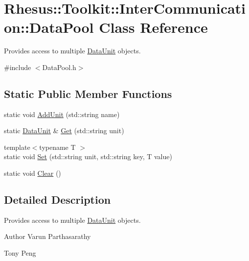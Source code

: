 \hypertarget{class_rhesus_1_1_toolkit_1_1_inter_communication_1_1_data_pool}{\section{Rhesus\-:\-:Toolkit\-:\-:Inter\-Communication\-:\-:Data\-Pool Class Reference}
\label{class_rhesus_1_1_toolkit_1_1_inter_communication_1_1_data_pool}
}


Provides access to multiple \hyperlink{class_rhesus_1_1_toolkit_1_1_inter_communication_1_1_data_unit}{Data\-Unit} objects.  




{\ttfamily \#include $<$Data\-Pool.\-h$>$}

\subsection*{Static Public Member Functions}
\begin{DoxyCompactItemize}
\item 
static void \hyperlink{class_rhesus_1_1_toolkit_1_1_inter_communication_1_1_data_pool_ad99c0b4b6f7d21ea959011e22dc0703d}{Add\-Unit} (std\-::string name)
\item 
static \hyperlink{class_rhesus_1_1_toolkit_1_1_inter_communication_1_1_data_unit}{Data\-Unit} \& \hyperlink{class_rhesus_1_1_toolkit_1_1_inter_communication_1_1_data_pool_a1a918813004c9ff921a47ed569fef3a0}{Get} (std\-::string unit)
\item 
{\footnotesize template$<$typename T $>$ }\\static void \hyperlink{class_rhesus_1_1_toolkit_1_1_inter_communication_1_1_data_pool_abce95cb12be677707cc5f05c167920cf}{Set} (std\-::string unit, std\-::string key, T value)
\item 
static void \hyperlink{class_rhesus_1_1_toolkit_1_1_inter_communication_1_1_data_pool_ad4b07d57880ee9dc05195e4b8715529e}{Clear} ()
\end{DoxyCompactItemize}


\subsection{Detailed Description}
Provides access to multiple \hyperlink{class_rhesus_1_1_toolkit_1_1_inter_communication_1_1_data_unit}{Data\-Unit} objects. 

\begin{DoxyAuthor}{Author}
Varun Parthasarathy 

Tony Peng 
\end{DoxyAuthor}


